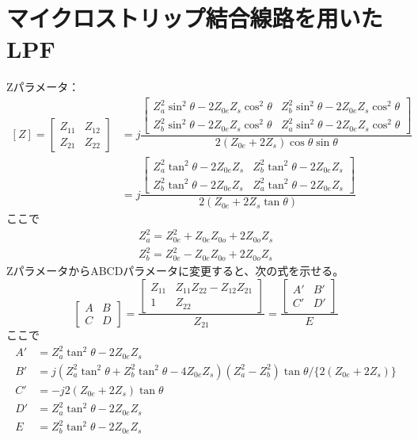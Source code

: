 \documentclass[12pt, fleqn]{jsarticle}
\begin{document}
\section{マイクロストリップ結合線路を用いたLPF}
Zパラメータ：
\begin{equation}
  \begin{split}
  [Z] = \begin{bmatrix}
    Z_{11} & Z_{12} \\
    Z_{21} & Z_{22}
  \end{bmatrix}
  &= j\dfrac{ \begin{bmatrix}
      Z_a^2 \sin^2\theta - 2 Z_{0e}Z_s \cos^2\theta &
      Z_b^2 \sin^2\theta - 2Z_{0e}Z_s \cos^2 \theta \\
      Z_b^2 \sin^2\theta - 2Z_{0e}Z_s \cos^2 \theta &
      Z_a^2 \sin^2\theta - 2 Z_{0e}Z_s \cos^2\theta
    \end{bmatrix}
  }{2(Z_{0e} + 2Z_s)\cos\theta\sin\theta} \\
  &= j\dfrac{\begin{bmatrix}
      Z_a^2\tan^2\theta - 2Z_{0e}Z_s &
      Z_b^2\tan^2\theta - 2Z_{0e}Z_s \\
      Z_b^2\tan^2\theta - 2Z_{0e}Z_s &
      Z_a^2\tan^2\theta - 2Z_{0e}Z_s
    \end{bmatrix}
  }{2(Z_{0e}+2Z_s\tan\theta)}
  \end{split}
\end{equation}
ここで
\begin{gather}
  Z^2_a = Z^2_{0e} + Z_{0e}Z_{0o} + 2Z_{0o}Z_s \\
  Z^2_b = Z^2_{0e} - Z_{0e}Z_{0o} + 2Z_{0o}Z_s
\end{gather}
ZパラメータからABCDパラメータに変更すると、次の式を示せる。
\begin{equation}
  \begin{bmatrix}
    A & B \\ C & D
  \end{bmatrix}
  = \dfrac{ \begin{bmatrix}
      Z_{11} & Z_{11}Z_{22} - Z_{12}Z_{21} \\ 1 & Z_{22}
    \end{bmatrix} }{Z_{21}}
  = \dfrac{ \begin{bmatrix}
    A' & B' \\ C' & D'      
    \end{bmatrix}}{E}
\end{equation}
ここで
\begin{align*}
  A' &= Z^2_a\tan^2\theta - 2Z_{0e}Z_s \\
  B' &= j(Z^2_a\tan^2\theta + Z^2_b\tan^2\theta-4Z_{0e}Z_s)(Z^2_a-Z^2_b)\tan\theta/\{2(Z_{0e} + 2Z_s)\} \\
  C' &= -j2(Z_{0e}+2Z_s)\tan\theta \\
  D' &= Z^2_a\tan^2\theta - 2Z_{0e}Z_s \\
  E &= Z_b^2\tan^2\theta-2Z_{0e}Z_s
\end{align*}
\end{document}
